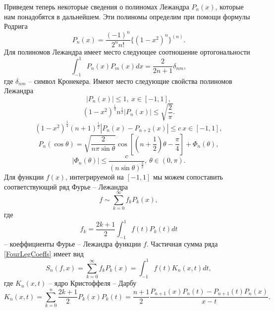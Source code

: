 Приведем теперь некоторые сведения о полиномах Лежандра $P_n(x)$, которые нам понадобятся в дальнейшем. Эти полиномы определим при помощи формулы Родрига
\begin{equation}\label{RodrigueFormula}
  P_n(x)=\frac{(-1)^n}{2^nn!}\{(1-x^2)^n\}^{(n)}.
\end{equation}
Для полиномов Лежандра имеет место следующее соотношение ортогональности
\begin{equation}\label{LegOrthRel}
  \int_{-1}^1P_n(x)P_m(x)dx=\frac{2}{2n+1}\delta_{nm},
\end{equation}
где $\delta_{nm}$ -- символ Кронекера. Имеют место следующие свойства полиномов Лежандра
\begin{equation}\label{Leg-Prop1}
  |P_n(x)|\le1,\ x\in[-1,1],
\end{equation}
\begin{equation}\label{Leg-Prop2}
  (1-x^2)^{\frac14}n^{\frac12}|P_n(x)|\le\sqrt{\frac2\pi}.
\end{equation}
\begin{equation}\label{Leg-Prop3}
  (1-x^2)^{\frac14}(n+1)^{\frac12}|P_n(x)-P_{n+2}(x)|\le c\ x\in[-1,1],
\end{equation}
\begin{equation}\label{Leg-Prop4}
  P_n(\cos\theta)=\sqrt{\frac2{n\pi\sin\theta}}\cos\left[\left(n+\frac12\right)\theta-\frac\pi4\right]+\Phi_n(\theta),
\end{equation}
\begin{equation}\label{Leg-Prop5}
  |\Phi_n(\theta)|\le\frac c{(n\sin\theta)^\frac32},\ \theta\in(0,\pi).
\end{equation}
Для функции $f(x)$, интегрируемой на $[-1,1]$ мы можем сопоставить соответствующий ряд Фурье -- Лежандра
\begin{equation}\label{FourLegSeries}
  f\sim\sum_{k=0}^\infty f_kP_k(x),
\end{equation}
где
\begin{equation}\label{FourLegCoeffs}
  f_k=\frac{2k+1}{2}\int_{-1}^1f(t)P_k(t)dt
\end{equation}
-- коеффициенты Фурье -- Лежандра функции $f$. Частичная сумма ряда \eqref{FourLegCoeffs} имеет вид
\begin{equation}\label{FourLegPartialSum}
  S_n(f,x)=\sum_{k=0}^\infty f_kP_k(x)=\int_{-1}^{1}f(t)K_n(x,t)dt,
\end{equation}
где $K_n(x,t)$ -- ядро Кристоффеля -- Дарбу
\begin{equation}\label{KrisDarbouxFormula}
 K_n(x,t)=\sum_{k=0}^n\frac{2k+1}{2}P_k(x)P_k(t)=\frac{n+1}2\frac{P_{n+1}(x)P_n(t)-P_{n+1}(t)P_n(x)}{x-t}.
\end{equation}
